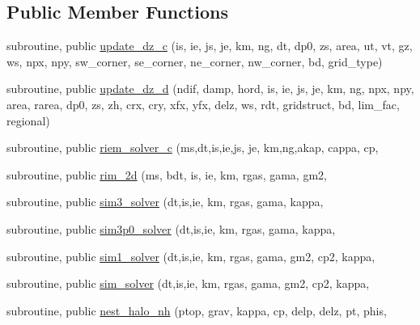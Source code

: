 \subsection*{Public Member Functions}
\begin{DoxyCompactItemize}
\item 
subroutine, public \hyperlink{classnh__utils__mod_a36a0fec4ebdcec481f3b6c8ba6253b65}{update\-\_\-dz\-\_\-c} (is, ie, js, je, km, ng, dt, dp0, zs, area, ut, vt, gz, ws, npx, npy, sw\-\_\-corner, se\-\_\-corner, ne\-\_\-corner, nw\-\_\-corner, bd, grid\-\_\-type)
\item 
subroutine, public \hyperlink{classnh__utils__mod_adf32b4a88ce6240d9debfd3349995f83}{update\-\_\-dz\-\_\-d} (ndif, damp, hord, is, ie, js, je, km, ng, npx, npy, area, rarea, dp0, zs, zh, crx, cry, xfx, yfx, delz, ws, rdt, gridstruct, bd, lim\-\_\-fac, regional)
\item 
subroutine, public \hyperlink{classnh__utils__mod_a14da13c6200ffaf1d0e7383c70d90953}{riem\-\_\-solver\-\_\-c} (ms,dt,is,ie,js, je, km,ng,akap, cappa, cp,
\item 
subroutine, public \hyperlink{classnh__utils__mod_aaeea343f189c7d5d1b9f3f36ae5bee4f}{rim\-\_\-2d} (ms, bdt, is, ie, km, rgas, gama, gm2,
\item 
subroutine, public \hyperlink{classnh__utils__mod_aecc67df51de5f53b7025e6f6ed103ba9}{sim3\-\_\-solver} (dt,is,ie, km, rgas, gama, kappa,
\item 
subroutine, public \hyperlink{classnh__utils__mod_afae0ba673c0252a21d9670c4edfb0cde}{sim3p0\-\_\-solver} (dt,is,ie, km, rgas, gama, kappa,
\item 
subroutine, public \hyperlink{classnh__utils__mod_a98974fe07b61f32996d5f0de2236c356}{sim1\-\_\-solver} (dt,is,ie, km, rgas, gama, gm2, cp2, kappa,
\item 
subroutine, public \hyperlink{classnh__utils__mod_ac5d00a80489a56b649ae2e96c0d1e9c7}{sim\-\_\-solver} (dt,is,ie, km, rgas, gama, gm2, cp2, kappa,
\item 
subroutine, public \hyperlink{classnh__utils__mod_a491dbc73f83656f3205fa363a1325972}{nest\-\_\-halo\-\_\-nh} (ptop, grav, kappa, cp, delp, delz, pt, phis,
\end{DoxyCompactItemize}
